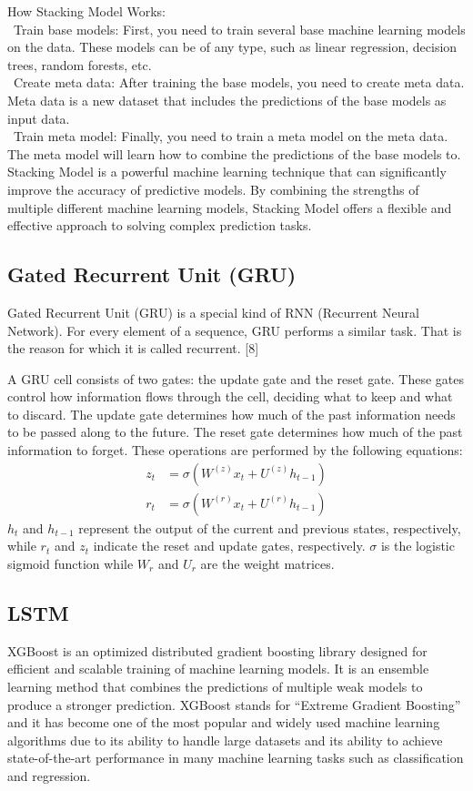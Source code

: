 \documentclass{ieeeojies}
\begin{document}
How Stacking Model Works:
\\
   \indent\textbullet\ Train base models: First, you need to train several base machine learning models on the data. These models can be of any type, such as linear regression, decision trees, random forests, etc. \\
   \indent\textbullet\ Create meta data: After training the base models, you need to create meta data. Meta data is a new dataset that includes the predictions of the base models as input data. \\
   \indent\textbullet\ Train meta model: Finally, you need to train a meta model on the meta data. The meta model will learn how to combine the predictions of the base models to.\\
Stacking Model is a powerful machine learning technique that can significantly improve the accuracy of predictive models. By combining the strengths of multiple different machine learning models, Stacking Model offers a flexible and effective approach to solving complex prediction tasks.

\subsection{Gated Recurrent Unit (GRU)} 
Gated Recurrent Unit (GRU) is a special kind of RNN (Recurrent Neural Network). For every element of a sequence, GRU performs a similar task. That is the reason for which it is called recurrent. [8]

A GRU cell consists of two gates: the update gate and the reset gate. These gates control how information flows through the cell, deciding what to keep and what to discard. The update gate determines how much of the past information needs to be passed along to the future. The reset gate determines how much of the past information to forget. These operations are performed by the following equations:
\begin{align*}
z_t &= \sigma\left( W^{(z)} x_t + U^{(z)} h_{t-1} \right) \\
r_t &= \sigma\left( W^{(r)} x_t + U^{(r)} h_{t-1} \right)
\end{align*}
\(h_t\) and \(h_{t-1}\) represent the output of the current and previous states, respectively, while \(r_t\) and \(z_t\) indicate the reset and update gates, respectively. \(\sigma\) is the logistic sigmoid function while \(W_r\) and \(U_r\) are the weight matrices.


\subsection{LSTM} 
XGBoost is an optimized distributed gradient boosting library designed for efficient and scalable training of machine learning models. It is an ensemble learning method that combines the predictions of multiple weak models to produce a stronger prediction. XGBoost stands for “Extreme Gradient Boosting” and it has become one of the most popular and widely used machine learning algorithms due to its ability to handle large datasets and its ability to achieve state-of-the-art performance in many machine learning tasks such as classification and regression.\\
\end{document}
